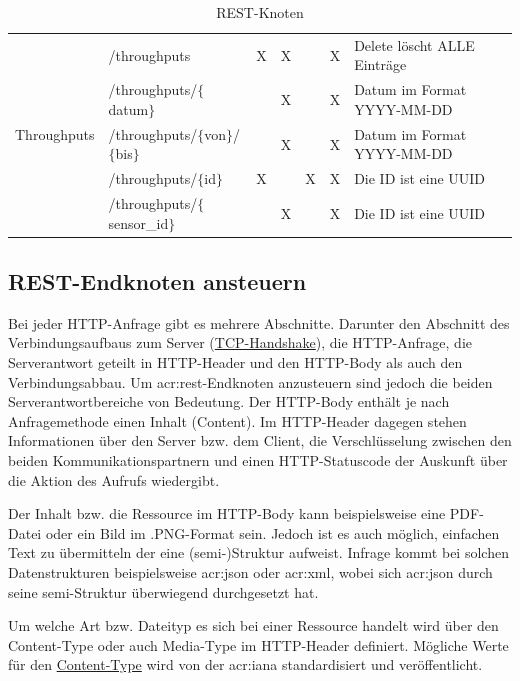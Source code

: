 \begin{landscape}
\begin{table}[H]
\begin{longtable}{lllllll}
      \multirow{5}{*}{Throughputs}    & /throughputs                  & X & X & & X & Delete löscht ALLE Einträge   \\
                                      & /throughputs/$\{$datum$\}$          &  & X & & X & Datum im Format YYYY-MM-DD     \\
                                      & /throughputs/$\{$von$\}$/$\{$bis$\}$      &  & X & & X & Datum im Format YYYY-MM-DD     \\
                                      & /throughputs/$\{$id$\}$             & X & & X & X & Die ID ist eine UUID          \\
                                      & /throughputs/$\{$sensor\_id$\}$     &  & X & & X & Die ID ist eine UUID           \\ \midrule
    \end{longtable}
    \caption{REST-Knoten}%
    \label{tbl:rest-knoten}
  \end{table}
\end{landscape}

\subsection{REST-Endknoten ansteuern}%
\label{sec:rest.ansteuern}
Bei jeder HTTP-Anfrage gibt es mehrere Abschnitte. Darunter den Abschnitt des Verbindungsaufbaus zum Server (\href{http://www.rvs.uni-bielefeld.de/~heiko/tcpip/tcpip_html_alt/kap_2_4.html}{TCP-Handshake}), die HTTP-Anfrage, die Serverantwort geteilt in HTTP-Header und den HTTP-Body als auch den Verbindungsabbau. Um \acrshort{acr:rest}-Endknoten anzusteuern sind jedoch die beiden Serverantwortbereiche von Bedeutung. Der HTTP-Body enthält je nach Anfragemethode einen Inhalt (Content). Im HTTP-Header dagegen stehen Informationen über den Server bzw. dem Client, die Verschlüsselung zwischen den beiden Kommunikationspartnern und einen HTTP-Statuscode der Auskunft über die Aktion des Aufrufs wiedergibt.

Der Inhalt bzw. die Ressource im HTTP-Body kann beispielsweise eine PDF-Datei oder ein Bild im .PNG-Format sein. Jedoch ist es auch möglich, einfachen Text zu übermitteln der eine (semi-)Struktur aufweist. Infrage kommt bei solchen Datenstrukturen beispielsweise \acrfull{acr:json} oder \acrfull{acr:xml}, wobei sich \acrshort{acr:json} durch seine semi-Struktur überwiegend durchgesetzt hat.

Um welche Art bzw. Dateityp es sich bei einer Ressource handelt wird über den Content-Type oder auch Media-Type im HTTP-Header definiert. Mögliche Werte für den \href{http://www.iana.org/assignments/media-types/media-types.xhtml}{Content-Type} wird von der \acrfull{acr:iana} standardisiert und veröffentlicht.

